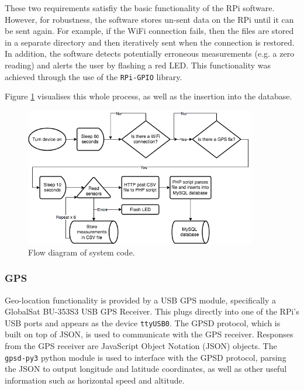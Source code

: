 \documentclass[11pt]{report}
\begin{document}
These two requirements satisfiy the basic functionality of the RPi software. However, for robustness, the software stores un-sent data on the RPi until it can be sent again. For example, if the WiFi connection fails, then the files are stored in a separate directory and then iteratively sent when the connection is restored. In addition, the software detects potentially erroneous measurements (e.g. a zero reading) and alerts the user by flashing a red LED. This functionality was achieved through the use of the \texttt{RPi-GPIO} library. 


Figure \ref{code_flow} visualises this whole process, as well as the insertion into the database.


\begin{figure}[!tb]
\centering
\includegraphics[width=0.9\textwidth]{images/code_flow}
\caption[Flow diagram of system code.]{Flow diagram of system code.}
\label{code_flow}
\end{figure}

\subsubsection{GPS}

Geo-location functionality is provided by a USB GPS module, specifically a GlobalSat BU-353S3 USB GPS Receiver. This plugs directly into one of the RPi's USB ports and appears as the device \texttt{ttyUSB0}. The GPSD protocol, which is built on top of JSON, is used to communicate with the GPS receiver. Responses from the GPS receiver are JavaScript Object Notation (JSON) objects. The \texttt{gpsd-py3} python module is used to interface with the GPSD protocol, parsing the JSON to output longitude and latitude coordinates, as well as other useful information such as horizontal speed and altitude. 
\end{document}
